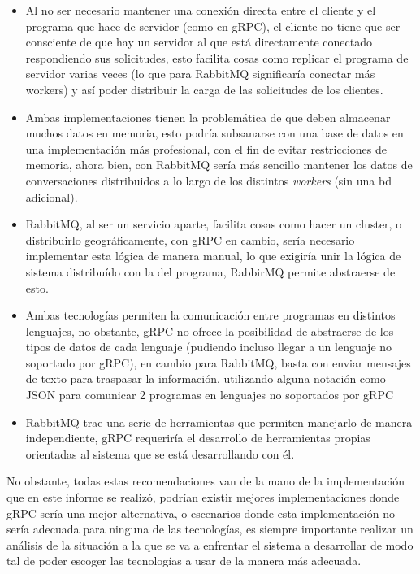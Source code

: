 \documentclass[11pt, letter]{article}
\begin{document}
\begin{itemize}
	\item Al no ser necesario mantener una conexión directa entre el cliente y el programa que hace de servidor (como en gRPC), el cliente no tiene que ser consciente de que hay un servidor al que está directamente conectado respondiendo sus solicitudes, esto facilita cosas como replicar el programa de servidor varias veces (lo que para RabbitMQ significaría conectar más workers) y así poder distribuir la carga de las solicitudes de los clientes.
	\item Ambas implementaciones tienen la problemática de que deben almacenar muchos datos en memoria, esto podría subsanarse con una base de datos en una implementación más profesional, con el fin de evitar restricciones de memoria, ahora bien, con RabbitMQ sería más sencillo mantener los datos de conversaciones distribuidos a lo largo de los distintos \textit{workers} (sin una bd adicional).
	\item RabbitMQ, al ser un servicio aparte, facilita cosas como hacer un cluster, o distribuirlo geográficamente, con gRPC en cambio, sería necesario implementar esta lógica de manera manual, lo que exigiría unir la lógica de sistema distribuído con la del programa, RabbirMQ permite abstraerse de esto.
	\item Ambas tecnologías permiten la comunicación entre programas en distintos lenguajes, no obstante, gRPC no ofrece la posibilidad de abstraerse de los tipos de datos de cada lenguaje (pudiendo incluso llegar a un lenguaje no soportado por gRPC), en cambio para RabbitMQ, basta con enviar mensajes de texto para traspasar la información, utilizando alguna notación como JSON\cite{RFC8259} para comunicar 2 programas en lenguajes no soportados por gRPC
	\item RabbitMQ trae una serie de herramientas que permiten manejarlo de manera independiente, gRPC requeriría el desarrollo de herramientas propias orientadas al sistema que se está desarrollando con él.
\end{itemize}

No obstante, todas estas recomendaciones van de la mano de la implementación que en este informe se realizó, podrían existir mejores implementaciones donde gRPC sería una mejor alternativa, o escenarios donde esta implementación no sería adecuada para ninguna de las tecnologías, es siempre importante realizar un análisis de la situación a la que se va a enfrentar el sistema a desarrollar de modo tal de poder escoger las tecnologías a usar de la manera más adecuada.
\end{document}
